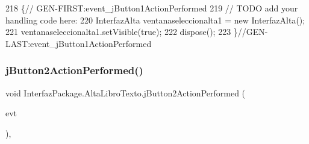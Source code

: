 \begin{DoxyCode}
218                                                                          \{\textcolor{comment}{//
      GEN-FIRST:event\_jButton1ActionPerformed}
219         \textcolor{comment}{// TODO add your handling code here:}
220         InterfazAlta ventanaseleccionalta1 = \textcolor{keyword}{new} InterfazAlta();
221         ventanaseleccionalta1.setVisible(\textcolor{keyword}{true});
222         dispose();
223     \}\textcolor{comment}{//GEN-LAST:event\_jButton1ActionPerformed}
\end{DoxyCode}
\mbox{\label{class_interfaz_package_1_1_alta_libro_texto_a8bd7d882c4dbfeef021a5a80b6d5559b}} 
\subsubsection{\texorpdfstring{j\+Button2\+Action\+Performed()}{jButton2ActionPerformed()}}
{\footnotesize\ttfamily void Interfaz\+Package.\+Alta\+Libro\+Texto.\+j\+Button2\+Action\+Performed (\begin{DoxyParamCaption}\item[{java.\+awt.\+event.\+Action\+Event}]{evt }\end{DoxyParamCaption})\hspace{0.3cm}{\ttfamily [inline]}, {\ttfamily [private]}}


